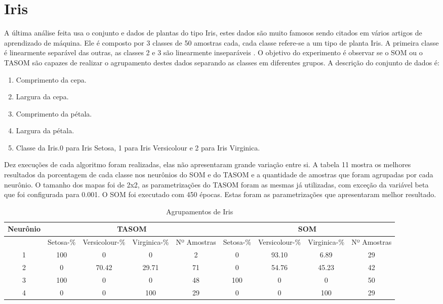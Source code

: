 \section{Iris} 
A última análise feita usa o conjunto e dados de plantas do tipo Iris, estes dados são muito famosos sendo citados em vários artigos de aprendizado de máquina. Ele é composto por 3 classes de 50 amostras cada, cada classe refere-se a um tipo de planta Iris. A primeira classe é linearmente separável das outras, as classes 2 e 3 são linearmente inseparáveis \cite{iris}. O objetivo do experimento é observar se o SOM ou o TASOM são capazes de realizar o agrupamento destes dados separando as classes em diferentes grupos. A descrição do conjunto de dados é:

\begin{enumerate}
\item Comprimento da cepa.
\item Largura da cepa.
\item Comprimento da pétala.
\item Largura da pétala.
\item Classe da Iris.0 para Iris Setosa, 1 para  Iris Versicolour e 2 para Iris Virginica.
\end{enumerate}

Dez execuções de cada algoritmo foram realizadas, elas não apresentaram grande variação entre si. A tabela 11 mostra os melhores resultados da porcentagem de cada classe nos neurônios do SOM e do TASOM e a quantidade de amostras que foram agrupadas por cada neurônio. O tamanho dos mapas foi de 2x2, as parametrizações do TASOM foram as mesmas já utilizadas, com exceção da variável beta que foi configurada para 0.001. O SOM foi executado com 450 épocas. Estas foram as parametrizações que apresentaram melhor resultado.

\begin{table}[h]
\centering
\caption{Agrupamentos de Iris}
\label{my-label}
\begin{tabular}{|c|c|c|c|c|c|c|c|c|}
\hline
Neurônio & \multicolumn{4}{c|}{TASOM}                   & \multicolumn{4}{c|}{SOM}                     \\ \hline
         & Setosa-\% & Versicolour-\% & Virginica-\% & Nº Amostras & Setosa-\% & Versicolour-\% & Virginica-\% & Nº Amostras \\ \hline
1        & 100      & 0        & 0        & 2           & 0       & 93.10        & 6.89       & 29         \\ \hline
2        & 0        & 70.42    & 29.71    & 71          & 0        & 54.76        & 45.23        & 42           \\ \hline
3        & 100      & 0        & 0        & 48          & 100        & 0        & 0        & 50           \\ \hline
4        & 0        & 0        & 100      & 29          & 0      & 0        & 100        & 29          \\ \hline
\end{tabular}
\end{table} 
 
